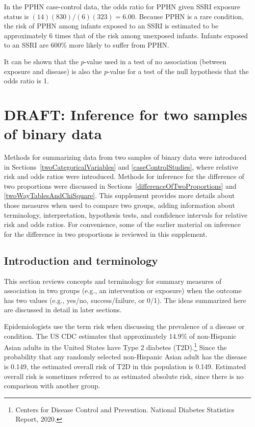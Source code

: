 In the PPHN case-control data, the odds ratio for PPHN given SSRI exposure status is $(14)(830)/(6)(323) = 6.00$.  Because PPHN is a rare condition, the risk of PPHN among infants exposed to an SSRI is estimated to be approximately 6 times that of the risk among unexposed infants.  Infants exposed to an SSRI are 600\% more likely to suffer from PPHN.  

It can be shown that the $p$-value used in a test of no association (between exposure and disease) is also the $p$-value for a test of the null hypothesis that the odds ratio is 1.


\section{DRAFT: Inference for two samples of binary data} \label{inferenceBinaryData}

Methods for summarizing data from two samples of binary data were introduced in    Sections~\ref{twoCategoricalVariables} and \ref{caseControlStudies}, where relative risk and odds ratios were introduced.  Methods for inference for the difference of two proportions were discussed in Sections~\ref{differenceOfTwoProportions} and \ref{twoWayTablesAndChiSquare}.  This supplement provides more details about those measures when used to compare two groups, adding information about terminology, interpretation, hypothesis tests, and confidence intervals for relative risk and odds ratios.  For convenience, some of the earlier material on inference for the difference in two proportions is reviewed in this supplement.  


\subsection{Introduction and terminology}
\label{introAndTerminologyForRisk}

This section reviews concepts and terminology for summary measures of association in two groups (e.g., an intervention or exposure) when the outcome has two values (e.g., yes/no, success/failure, or 0/1).  The ideas summarized here are discussed in detail in later sections.

Epidemiologists use the term risk when discussing the prevalence of a disease or condition.  The US CDC estimates that approximately 14.9\% of non-Hispanic Asian adults in the United States have Type 2 diabetes (T2D).\footnote{Centers for Disease Control and Prevention. National Diabetes Statistics Report, 2020.}  Since the probability that any randomly selected non-Hispanic Asian adult has the disease is 0.149, the estimated overall risk of T2D in this population is 0.149. Estimated overall risk is sometimes referred to as estimated absolute risk, since there is no comparison with another group.

